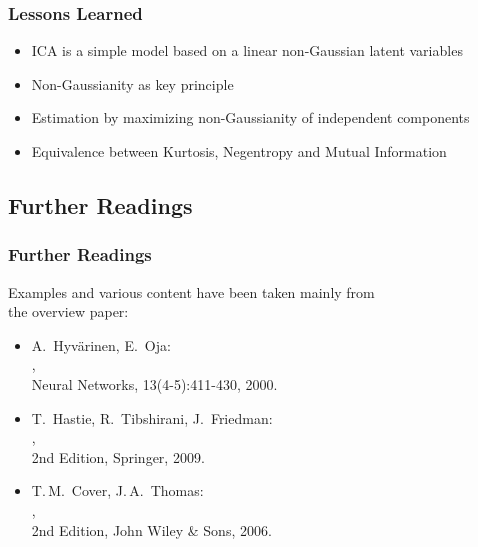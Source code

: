 \begin{frame}
  \frametitle{Lessons Learned}
  
  \begin{itemize}
    \item ICA is a simple model based on a linear non-Gaussian latent variables \\[.25cm]
    \item Non-Gaussianity as key principle \\[.25cm]
    \item Estimation by maximizing non-Gaussianity of independent components \\[.25cm]
    \item Equivalence between Kurtosis, Negentropy and Mutual Information
  \end{itemize}
\end{frame}



\subsection{Further Readings}

\begin{frame}
  \frametitle{Further Readings}

  Examples and various content have been taken mainly from \\
  the overview paper:

  \begin{itemize}
    \item A.\ Hyv{\"a}rinen, E.\ Oja: \\
      , \\
      Neural Networks, 13(4-5):411-430, 2000. \\[.25cm]
  \end{itemize}

  
  \begin{itemize}
    \item T.\ Hastie, R.\ Tibshirani, J.\ Friedman: \\
      , \\
      2nd Edition, Springer, 2009. \\[.15cm]
    \item T.\,M.\ Cover, J.\,A.\ Thomas: \\
      , \\
      2nd Edition, John Wiley \& Sons, 2006.
  \end{itemize}
\end{frame}


